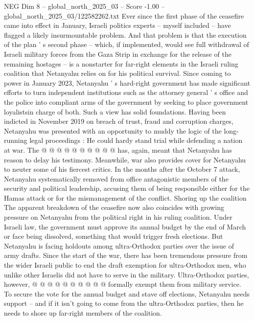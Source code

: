 \begin{textsample}{NEG Dim 8 – global\_north\_2025\_03 – Score -1.00 – global\_north\_2025\_03/122582262.txt}  \label{ex:f8_neg_367}
Ever since the first phase of the ceasefire came into effect in January, Israeli politics experts -- myself included -- have flagged a likely insurmountable problem.
And that problem is that the execution of the plan ' s second phase -- which, if implemented, would see full withdrawal of Israeli military forces from the Gaza Strip in exchange for the release of the remaining hostages -- is a nonstarter for far-right elements in the Israeli ruling coalition that Netanyahu relies on for his political survival.
Since coming to power in January 2023, Netanyahu ' s hard-right government has made significant efforts to turn independent institutions such as the attorney general ' s office and the police into compliant arms of the government by seeking to place government loyalistsin charge of both.
Such a view has solid foundations.
Having been indicted in November 2019 on breach of trust, fraud and corruption charges, Netanyahu was presented with an opportunity to muddy the logic of the long-running legal proceedings : He could hardy stand trial while defending a nation at war.
The @ @ @ @ @ @ @ @ @ @ has, again, meant that Netanyahu has reason to delay his testimony.
Meanwhile, war also provides cover for Netanyahu to neuter some of his fiercest critics.
In the months after the October 7 attack, Netanyahu systematically removed from office antagonistic members of the security and political leadership, accusing them of being responsible either for the Hamas attack or for the mismanagement of the conflict.
Shoring up the coalition The apparent breakdown of the ceasefire now also coincides with growing pressure on Netanyahu from the political right in his ruling coalition.
Under Israeli law, the government must approve its annual budget by the end of March or face being dissolved, something that would trigger fresh elections.
But Netanyahu is facing holdouts among ultra-Orthodox parties over the issue of army drafts.
Since the start of the war, there has been tremendous pressure from the wider Israeli public to end the draft exemption for ultra-Orthodox men, who unlike other Israelis did not have to serve in the military.
Ultra-Orthodox parties, however, @ @ @ @ @ @ @ @ @ @ formally exempt them from military service.
To secure the vote for the annual budget and stave off elections, Netanyahu needs support -- and if it isn't going to come from the ultra-Orthodox parties, then he needs to shore up far-right members of the coalition.

\end{textsample}
